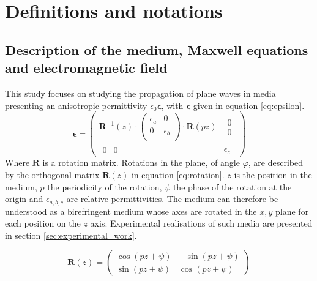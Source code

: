 \section{Definitions and notations}

\subsection{Description of the medium, Maxwell equations and electromagnetic field}

This study focuses on studying the propagation of plane waves in media presenting an anisotropic permittivity $\epsilon_0\bm{\epsilon}$, with $\bm{\epsilon}$ given in equation \ref{eq:epsilon}.
\begin{equation}
\bm{\epsilon} = \begin{pmatrix}\bm{R}^{-1}(z)\cdot\begin{pmatrix}
\epsilon_a & 0\\
0 & \epsilon_b\\
\end{pmatrix}\cdot\bm{R}(pz) & \begin{matrix}
0\\0
\end{matrix}\\
\begin{matrix}
0 & 0
\end{matrix} & \epsilon_c
\end{pmatrix}
\label{eq:epsilon}
\end{equation}
%
Where $\bm{R}$ is a rotation matrix. Rotations in the plane, of angle $\varphi$, are described by the orthogonal matrix $\bm{R}(z)$ in equation \ref{eq:rotation}. $z$ is the position in the medium, $p$ the periodicity of the rotation, $\psi$ the phase of the rotation at the origin and $\epsilon_{a,b,c}$ are relative permittivities. The medium can therefore be understood as a birefringent medium whose axes are rotated in the $x,y$ plane for each position on the $z$ axis. Experimental realisations of such media are presented in section \ref{sec:experimental_work}.

\begin{equation}
\bm{R}(z) = \begin{pmatrix}
\cos(pz+\psi) & -\sin(pz+\psi)\\
\sin(pz+\psi) & \cos(pz+\psi)
\end{pmatrix} \label{eq:rotation}
\end{equation}

